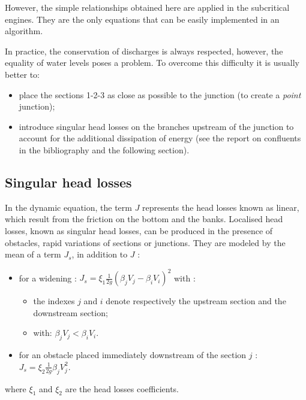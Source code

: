 However, the simple relationships obtained here are applied in the subcritical engines. They are the only equations that can be easily implemented in an algorithm.

In practice, the conservation of discharges is always respected, however, the equality of water levels poses a problem. To overcome this difficulty it is usually better to:
\begin{itemize}
 \item place the sections 1-2-3 as close as possible to the junction (to create a \textit{point} junction);
 \item introduce singular head losses on the branches upstream of the junction to account for the additional dissipation of energy (see the report on confluents in the bibliography and the following section).
\end{itemize}

\subsection{Singular head losses}

In the dynamic equation, the term $J$ represents the head losses known as linear, which result from the friction on the bottom and the banks. Localised head losses, known as singular head losses, can be produced in the presence of obstacles, rapid variations of sections or junctions.
They are modeled by the mean of a term $J_s$, in addition to $J$ :
\begin{itemize}
 \item for a widening : $J_s = \xi_1 \frac{1}{2 g}(\beta_j V_j - \beta_i V_i)^2$ with :
   \begin{itemize}
     \item the indexes $j$ and $i$ denote respectively the upstream section and the downstream section;
     \item with: $\beta_j V_j < \beta_i V_i$.
   \end{itemize}
 \item for an obstacle placed immediately downstream of the section $j$ : \\ $J_s = \xi_2 \frac{1}{2g} \beta_j V_{j}^2$.
\end{itemize}

where $\xi_1$ and $\xi_2$ are the head losses coefficients.

